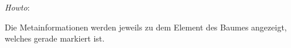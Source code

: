 \emph{Howto}:

Die Metainformationen werden jeweils zu dem Element des Baumes angezeigt,
welches gerade markiert ist.